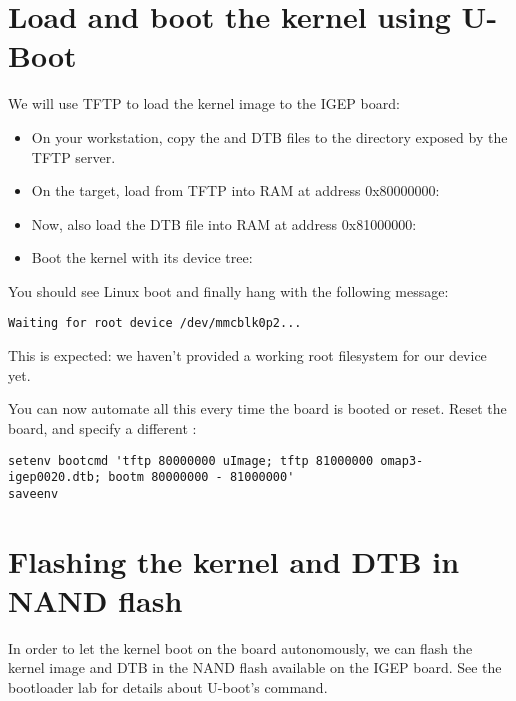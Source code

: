 \section{Load and boot the kernel using U-Boot}

We will use TFTP to load the kernel image to the IGEP board:

\begin{itemize}

\item On your workstation, copy the  and DTB files to the
  directory exposed by the TFTP server.

\item On the target, load  from TFTP into RAM at address
  0x80000000:\\

\item Now, also load the DTB file into RAM at address 0x81000000:\\

\item Boot the kernel with its device tree:\\

\end{itemize}

You should see Linux boot and finally hang with the following message:

\begin{verbatim}
Waiting for root device /dev/mmcblk0p2...
\end{verbatim}

This is expected: we haven't provided a working root filesystem for
our device yet.

You can now automate all this every time the board is booted or
reset. Reset the board, and specify a different :

{\scriptsize
\begin{verbatim}
setenv bootcmd 'tftp 80000000 uImage; tftp 81000000 omap3-igep0020.dtb; bootm 80000000 - 81000000'
saveenv
\end{verbatim}
}

\section{Flashing the kernel and DTB in NAND flash}

In order to let the kernel boot on the board autonomously, we can
flash the kernel image and DTB in the NAND flash available on the IGEP
board. See the bootloader lab for details about U-boot's 
command.

